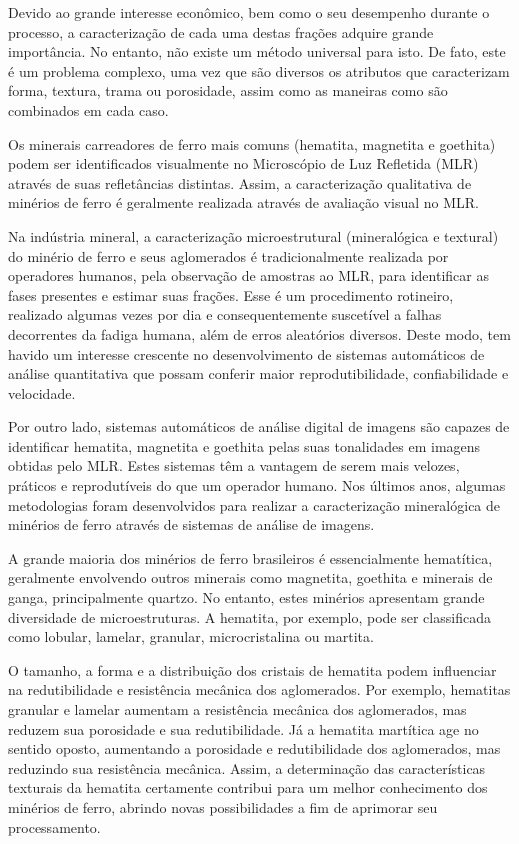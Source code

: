 Devido ao grande interesse econômico, bem como o seu desempenho
durante o processo, a caracterização de cada uma destas frações
adquire grande importância. No entanto, não existe um método universal
para isto. De fato, este é um problema complexo, uma vez que são
diversos os atributos que caracterizam forma, textura, trama ou
porosidade, assim como as maneiras como são combinados em cada
caso.\cite{4}

Os minerais carreadores de ferro mais comuns (hematita, magnetita e
goethita) podem ser identificados visualmente no Microscópio de Luz
Refletida (MLR) através de suas refletâncias distintas.\cite{5} Assim,
a caracterização qualitativa de minérios de ferro é geralmente
realizada através de avaliação visual no MLR.

Na indústria mineral, a caracterização microestrutural (mineralógica e
textural) do minério de ferro e seus aglomerados é tradicionalmente
realizada por operadores humanos, pela observação de amostras ao MLR,
para identificar as fases presentes e estimar suas frações. Esse é um
procedimento rotineiro, realizado algumas vezes por dia e
consequentemente suscetível a falhas decorrentes da fadiga humana,
além de erros aleatórios diversos. Deste modo, tem havido um interesse
crescente no desenvolvimento de sistemas automáticos de análise
quantitativa que possam conferir maior reprodutibilidade,
confiabilidade e velocidade.

Por outro lado, sistemas automáticos de análise digital de imagens são
capazes de identificar hematita, magnetita e goethita pelas suas
tonalidades em imagens obtidas pelo MLR. Estes sistemas têm a vantagem
de serem mais velozes, práticos e reprodutíveis do que um operador
humano. Nos últimos anos, algumas metodologias foram desenvolvidos
para realizar a caracterização mineralógica de minérios de ferro
através de sistemas de análise de imagens.\cite{6,7,8,9}

A grande maioria dos minérios de ferro brasileiros é essencialmente
hematítica, geralmente envolvendo outros minerais como magnetita,
goethita e minerais de ganga, principalmente quartzo. No entanto,
estes minérios apresentam grande diversidade de microestruturas. A
hematita, por exemplo, pode ser classificada como lobular, lamelar,
granular, microcristalina ou martita.

O tamanho, a forma e a distribuição dos cristais de hematita podem
influenciar na redutibilidade e resistência mecânica dos
aglomerados. Por exemplo, hematitas granular e lamelar aumentam a
resistência mecânica dos aglomerados, mas reduzem sua porosidade e sua
redutibilidade. Já a hematita martítica age no sentido oposto,
aumentando a porosidade e redutibilidade dos aglomerados, mas
reduzindo sua resistência mecânica.\cite{2,10,11} Assim, a
determinação das características texturais da hematita certamente
contribui para um melhor conhecimento dos minérios de ferro, abrindo
novas possibilidades a fim de aprimorar seu processamento.\cite{12}

